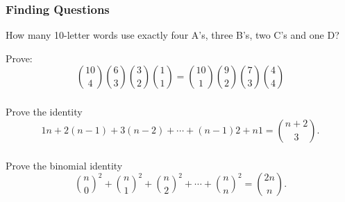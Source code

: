 \documentclass[11pt, compress]{beamer}
\begin{document}
\begin{frame}
\frametitle{Finding Questions}
 How many 10-letter words use exactly four A's, three B's, two C's and one D?
 
\pause \vfill 

Prove:%
\begin{equation*}
{10 \choose 4}{6 \choose 3}{3 \choose 2}{1 \choose 1} = {10 \choose 1}{9 \choose 2}{7 \choose 3}{4 \choose 4}
\end{equation*}

\end{frame}
 
\begin{frame}
\frametitle{}
\begin{example}[1.4.6]Prove the identity%
\begin{equation*}
1 n + 2(n-1) + 3 (n-2) + \cdots + (n-1) 2 + n 1 = {n+2 \choose 3}\text{.}
\end{equation*}

\end{example}
\end{frame}
 
\begin{frame}
\frametitle{}
\begin{example}[1.4.7]Prove the binomial identity%
\begin{equation*}
{n \choose 0}^2 + {n \choose 1}^2 + {n \choose 2}^2 + \cdots + {n \choose n}^2 = {2n \choose n}\text{.}
\end{equation*}

\end{example}
\end{frame}
 
\end{document}
